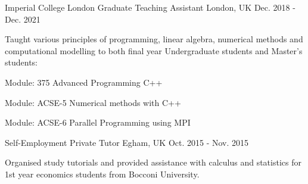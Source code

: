 \begin{cventries}
  \cventry
    {Imperial College London}
    {Graduate Teaching Assistant}
    {London, UK}
    {Dec. 2018 - Dec. 2021}
    {
      Taught various principles of programming, linear algebra, 
      numerical methods and computational modelling to both final year Undergraduate
      students and Master's students:\hfill \break%
      \begin{cvitems}
        \item {Module: 375 Advanced Programming C++}
        \item {Module: ACSE-5 Numerical methods with C++}
        \item {Module: ACSE-6 Parallel Programming using MPI}
      \end{cvitems} 
    }

  \cventry
  	{Self-Employment}
		{Private Tutor}
		{Egham, UK}
		{Oct. 2015 - Nov. 2015}
		{
	 	  \begin{cvitems}
	  		\item {Organised study tutorials and provided assistance with calculus and statistics for 1st year economics students from Bocconi University.}
		  \end{cvitems}
		}
		

\end{cventries}
